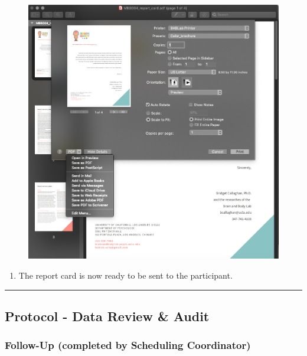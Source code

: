 \documentclass[]{book}
\providecommand{\tightlist}{%
  \setlength{\itemsep}{0pt}\setlength{\parskip}{0pt}}
\begin{document}
\begin{figure}
\centering
\includegraphics{images/final_checklist/report_cards/7.png}
\caption{}
\end{figure}

\begin{enumerate}
\def\labelenumi{\arabic{enumi}.}
\setcounter{enumi}{7}
\tightlist
\item
  The report card is now ready to be sent to the participant.
\end{enumerate}

\begin{center}\rule{0.5\linewidth}{0.5pt}\end{center}

\hypertarget{protocol---data-review-audit}{%
\subsection{Protocol - Data Review \& Audit}\label{protocol---data-review-audit}}

\hypertarget{follow-up-completed-by-scheduling-coordinator}{%
\subsubsection{Follow-Up (completed by Scheduling Coordinator)}\label{follow-up-completed-by-scheduling-coordinator}}
\end{document}
